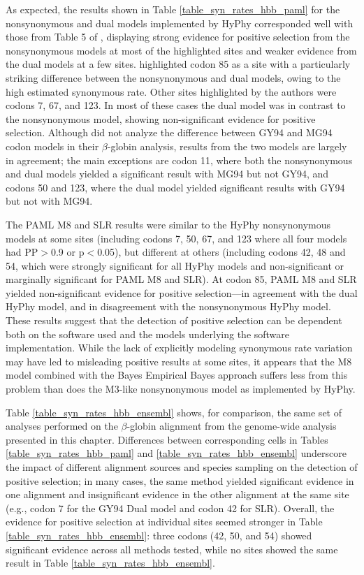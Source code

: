 As expected, the results shown in Table \ref{table_syn_rates_hbb_paml}
for the nonsynonymous and dual models implemented by HyPhy
corresponded well with those from Table 5 of \citet{Pond2005b},
displaying strong evidence for positive selection from the
nonsynonymous models at most of the highlighted sites and weaker
evidence from the dual models at a few sites. \citet{Pond2005b}
highlighted codon 85 as a site with a particularly striking difference
between the nonsynonymous and dual models, owing to the high estimated
synonymous rate. Other sites highlighted by the authors were codons 7,
67, and 123. In most of these cases the dual model was in contrast to
the nonsynonymous model, showing non-significant evidence for positive
selection. Although \citet{Pond2005b} did not analyze the difference
between GY94 and MG94 codon models in their $\beta$-globin analysis,
results from the two models are largely in agreement; the main
exceptions are codon 11, where both the nonsynonymous and dual models
yielded a significant result with MG94 but not GY94, and codons 50 and
123, where the dual model yielded significant results with GY94 but
not with MG94.

The PAML M8 and SLR results were similar to the HyPhy nonsynonymous
models at some sites (including codons 7, 50, 67, and 123 where all
four models had PP$>$0.9 or p$<$0.05), but different at others (including
codons 42, 48 and 54, which were strongly significant for all HyPhy
models and non-significant or marginally significant for PAML M8 and
SLR). At codon 85, PAML M8 and SLR yielded non-significant evidence
for positive selection---in agreement with the dual HyPhy model, and
in disagreement with the nonsynonymous HyPhy model. These results
suggest that the detection of positive selection can be dependent both
on the software used and the models underlying the software
implementation. While the lack of explicitly modeling synonymous rate
variation may have led to misleading positive results at some sites,
it appears that the M8 model combined with the Bayes Empirical Bayes
approach suffers less from this problem than does the M3-like
nonsynonymous model as implemented by HyPhy.

Table \ref{table_syn_rates_hbb_ensembl} shows, for comparison, the
same set of analyses performed on the $\beta$-globin alignment from
the genome-wide analysis presented in this chapter. Differences
between corresponding cells in Tables \ref{table_syn_rates_hbb_paml}
and \ref{table_syn_rates_hbb_ensembl} underscore the impact of
different alignment sources and species sampling on the detection of
positive selection; in many cases, the same method yielded significant
evidence in one alignment and insignificant evidence in the other
alignment at the same site (e.g., codon 7 for the GY94 Dual model and
codon 42 for SLR). Overall, the evidence for positive selection at
individual sites seemed stronger in Table
\ref{table_syn_rates_hbb_ensembl}: three codons (42, 50, and 54)
showed significant evidence across all methods tested, while no sites
showed the same result in Table \ref{table_syn_rates_hbb_ensembl}.


